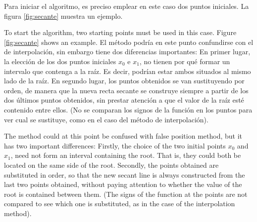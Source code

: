 \begin{paracol}{2}
Para iniciar el algoritmo, es preciso emplear en este caso dos puntos iniciales. La figura \ref{fig:secante} muestra un ejemplo.

    \switchcolumn
    To start the algorithm, two starting points must be used in this case. Figure \ref{fig:secante} shows an example.
\switchcolumn
El método podría en este punto confundirse con el de interpolación, sin embargo tiene dos diferencias importantes: En primer lugar, la elección de los dos puntos iniciales $x_0$ e $x_1$, no tienen por qué formar un intervalo que contenga a la raíz. Es decir, podrían estar ambos situados al mismo lado de la raíz. En segundo lugar, los puntos obtenidos se van sustituyendo por orden, de manera que la nueva recta secante se construye siempre a partir de los dos últimos puntos obtenidos, sin prestar atención a que el valor de la raíz esté contenido entre ellos. (No se comparan los signos de la función en los puntos para ver cual se sustituye, como en el caso del método de interpolación). 

\switchcolumn
The method could at this point be confused with false position method, but it has two important differences: Firstly, the choice of the two initial points $x_0$ and $x_1$, need not form an interval containing the root. That is, they could both be located on the same side of the root. Secondly, the points obtained are substituted in order, so that the new secant line is always constructed from the last two points obtained, without paying attention to whether the value of the root is contained between them. (The signs of the function at the points are not compared to see which one is substituted, as in the case of the interpolation method). 

\end{paracol}

